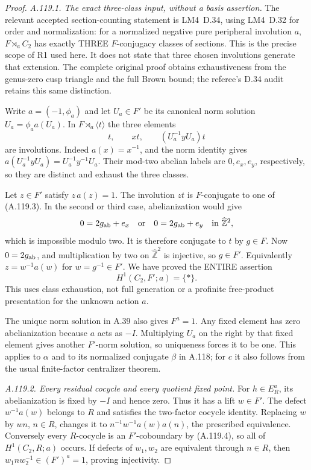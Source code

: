 \begin{proof}
\emph{A.119.1. The exact three-class input, without a basis assertion.}
The relevant accepted section-counting statement is
LM4~D.34, using LM4~D.32 for order and normalization:
for a normalized negative pure peripheral involution \(a\),
\(F\rtimes_a C_2\) has exactly THREE \(F\)-conjugacy classes
of sections. This is the precise scope of R1 used here.
It does not state that three chosen involutions generate that
extension. The complete original proof obtains exhaustiveness
from the genus-zero cusp triangle and the full Brown bound;
the referee's D.34 audit retains this same distinction.

Write \(a=(-1,\phi_a)\) and let \(U_a\in F'\) be its canonical
norm solution \(U_a=\phi_a a(U_a)\).
In \(F\rtimes_a\langle t\rangle\) the three elements
\[
               t,\qquad xt,\qquad (U_a^{-1}yU_a)t
 \tag{A.119.3}
\]
are involutions. Indeed \(a(x)=x^{-1}\), and the norm identity
gives
\(a(U_a^{-1}yU_a)=U_a^{-1}y^{-1}U_a\).
Their mod-two abelian labels are \(0,e_x,e_y\), respectively,
so they are distinct and exhaust the three classes.

Let \(z\in F'\) satisfy \(z\,a(z)=1\).
The involution \(zt\) is \(F\)-conjugate to one of (A.119.3).
In the second or third case, abelianization would give
\[
          0=2g_{\rm ab}+e_x\quad\text{or}\quad
          0=2g_{\rm ab}+e_y
               \quad\text{in }\widehat{\mathbb Z}^2,
\]
which is impossible modulo two.
It is therefore conjugate to \(t\) by \(g\in F\).
Now \(0=2g_{\rm ab}\), and multiplication by two on
\(\widehat{\mathbb Z}^2\) is injective, so \(g\in F'\).
Equivalently \(z=w^{-1}a(w)\) for \(w=g^{-1}\in F'\).
We have proved the ENTIRE assertion
\[
                         H^1(C_2,F';a)=\{*\}.
 \tag{A.119.4}
\]
This uses class exhaustion, not full generation or a profinite
free-product presentation for the unknown action \(a\).

The unique norm solution in A.39 also gives \(F^a=1\).
Any fixed element has zero abelianization because \(a\) acts
as \(-I\). Multiplying \(U_a\) on the right by that fixed
element gives another \(F'\)-norm solution, so uniqueness
forces it to be one. This applies to \(\alpha\) and to its
normalized conjugate \(\beta\) in A.118; for \(c\) it also follows
from the usual finite-factor centralizer theorem.

\emph{A.119.2. Every residual cocycle and every quotient fixed point.}
For \(h\in E_R^a\), its abelianization is fixed by \(-I\)
and hence zero. Thus it has a lift \(w\in F'\).
The defect \(w^{-1}a(w)\) belongs to \(R\) and satisfies the
two-factor cocycle identity. Replacing \(w\) by \(wn\),
\(n\in R\), changes it to \(n^{-1}w^{-1}a(w)a(n)\),
the prescribed equivalence.
Conversely every \(R\)-cocycle is an \(F'\)-coboundary by
(A.119.4), so all of \(H^1(C_2,R;a)\) occurs.
If defects of \(w_1,w_2\) are equivalent through \(n\in R\),
then \(w_1nw_2^{-1}\in(F')^a=1\), proving injectivity.


\end{proof}
